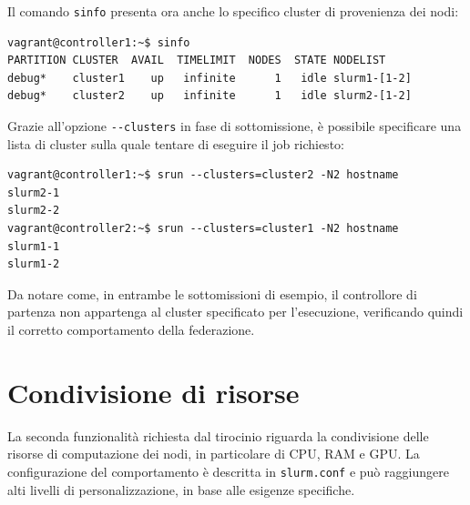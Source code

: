 \documentclass[12pt,a4paper,twoside,openright]{book}
\begin{document}
Il comando \texttt{sinfo} presenta ora anche lo specifico cluster di provenienza dei nodi:
\begin{verbatim}
vagrant@controller1:~$ sinfo
PARTITION CLUSTER  AVAIL  TIMELIMIT  NODES  STATE NODELIST
debug*    cluster1    up   infinite      1   idle slurm1-[1-2]
debug*    cluster2    up   infinite      1   idle slurm2-[1-2]
\end{verbatim}
Grazie all'opzione \texttt{{-}{-}clusters} in fase di sottomissione, è possibile specificare una lista di cluster sulla quale tentare di eseguire il job richiesto:
\begin{verbatim}
vagrant@controller1:~$ srun --clusters=cluster2 -N2 hostname
slurm2-1
slurm2-2
vagrant@controller2:~$ srun --clusters=cluster1 -N2 hostname
slurm1-1
slurm1-2
\end{verbatim}
Da notare come, in entrambe le sottomissioni di esempio, il controllore di partenza non appartenga al cluster specificato per l'esecuzione, verificando quindi il corretto comportamento della federazione.

\section{Condivisione di risorse}
La seconda funzionalità richiesta dal tirocinio riguarda la condivisione delle risorse di computazione dei nodi, in particolare di \ac{CPU}, \ac{RAM} e \ac{GPU}. La configurazione del comportamento è descritta in \texttt{slurm.conf} e può raggiungere alti livelli di personalizzazione, in base alle esigenze specifiche.
\end{document}

